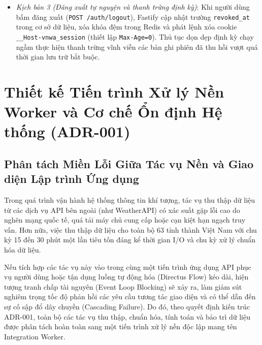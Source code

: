\begin{itemize}
\begin{equation}
\begin{aligned}
    \Psi_{\text{annihilate}}(s) : \begin{cases}
    s.\text{revoked\_at} \leftarrow t_{\text{detection}} \\
    s.\text{revoke\_reason} \leftarrow \text{`token\_reuse\_detected'}
    \end{cases}
    \end{aligned}
    \end{equation}
    Đồng thời, toàn bộ khóa liên đới trong Redis bị xóa sạch và một cảnh báo an ninh nghiêm trọng được ghi vào nhật ký kiểm toán, trung hòa hoàn toàn nguy cơ kẻ tấn công lợi dụng phiên bị rò rỉ.
    \item[-] \textit{Kịch bản 3 (Đăng xuất tự nguyện và thanh trừng định kỳ)}: Khi người dùng bấm đăng xuất (\texttt{POST /auth/logout}), Fastify cập nhật trường \texttt{revoked\_at} trong cơ sở dữ liệu, xóa khóa đệm trong Redis và phát lệnh xóa cookie \texttt{\_\_Host-vnwa\_session} (thiết lập \texttt{Max-Age=0}). Thủ tục dọn dẹp định kỳ chạy ngầm thực hiện thanh trừng vĩnh viễn các bản ghi phiên đã thu hồi vượt quá thời gian lưu trữ bắt buộc.
\end{itemize}

\section{Thiết kế Tiến trình Xử lý Nền Worker và Cơ chế Ổn định Hệ thống (ADR-001)}
\label{sec:worker_resilience_adr001}

\subsection{Phân tách Miền Lỗi Giữa Tác vụ Nền và Giao diện Lập trình Ứng dụng}
Trong quá trình vận hành hệ thống thông tin khí tượng, tác vụ thu thập dữ liệu từ các dịch vụ API bên ngoài (như WeatherAPI) có xác suất gặp lỗi cao do nghẽn mạng quốc tế, quá tải máy chủ cung cấp hoặc cạn kiệt hạn ngạch truy vấn. Hơn nữa, việc thu thập dữ liệu cho toàn bộ 63 tỉnh thành Việt Nam với chu kỳ 15 đến 30 phút một lần tiêu tốn đáng kể thời gian I/O và chu kỳ xử lý chuẩn hóa dữ liệu.

Nếu tích hợp các tác vụ này vào trong cùng một tiến trình ứng dụng API phục vụ người dùng hoặc tận dụng luồng tự động hóa (Directus Flow) kéo dài, hiện tượng tranh chấp tài nguyên (Event Loop Blocking) sẽ xảy ra, làm giảm sút nghiêm trọng tốc độ phản hồi các yêu cầu tương tác giao diện và có thể dẫn đến sự cố sập đổ dây chuyền (Cascading Failure). Do đó, theo quyết định kiến trúc ADR-001, toàn bộ các tác vụ thu thập, chuẩn hóa, tính toán và bảo trì dữ liệu được phân tách hoàn toàn sang một tiến trình xử lý nền độc lập mang tên Integration Worker.

